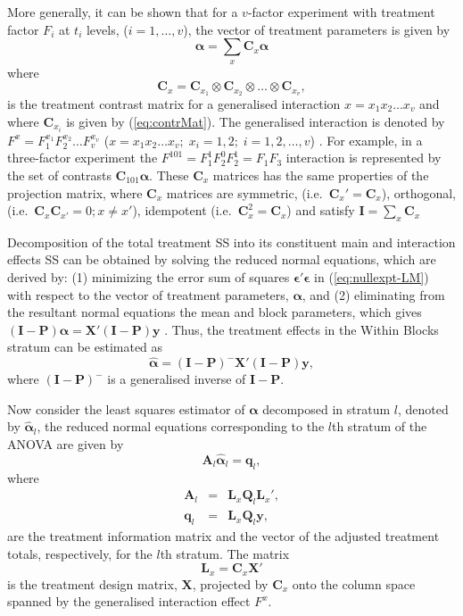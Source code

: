 \documentclass[article]{jss}
\newcommand{\mP}{\mathbf{P}}
\newcommand{\I}{\mathbf{I}}
\newcommand{\X}{\mathbf{X}}
\newcommand{\Q}{\mathbf{Q}}
\newcommand{\A}{\mathbf{A}}
\newcommand{\C}{\mathbf{C}}
\newcommand{\mL}{\mathbf{L}}
\begin{document}
More generally, it can be shown that for a $v$-factor experiment with treatment factor $F_i$ at $t_i$ levels, ($i = 1, \dots, v$), the vector of treatment parameters is given by 
\begin{equation}
\bm{\alpha} = \sum_x{\C_x\bm{\alpha}}
\end{equation}
where 
\[
\C_x =  \C_{x_1} \otimes  \C_{x_2} \otimes \dots \otimes  \C_{x_{v}},
\]
is the treatment contrast matrix for a generalised interaction $x = x_1 x_2 \dots x_{v}$ and where  
$\C_{x_i}$ is given by (\ref{eq:contrMat}). The generalised interaction is denoted by $F^{x}=  F^{x_1}_1 F^{x_2}_2 \dots F^{x_v}_v$ ($x = x_1 x_2 \dots x_{v}; \; x_i= 1,2; \; i=1,2,\ldots,v$) \citep{John1987}. For example, in a three-factor experiment the $F^{101} =F^{1}_1 F^{0}_2 F^{1}_2 = F_1F_3$ interaction is represented by the set of contrasts $\C_{101}\bm{\alpha}$. These $\C_x$ matrices has the same properties of the projection matrix, where $\C_x$ matrices are symmetric, (i.e.\ $\C_x' = \C_x$), orthogonal, (i.e.\ $\C_x\C_{x'} = 0; x \neq x'$), idempotent (i.e.\ $\C_x^2 = \C_x$) and satisfy $\I = \sum_x{\C_x}$ \cite{John1987}

Decomposition of the total treatment SS into its constituent main and interaction effects SS can be obtained by solving the reduced normal equations, which are derived by: (1) minimizing the error sum of squares $\bm{\epsilon}'\bm{\epsilon}$ in (\ref{eq:nullexpt-LM}) with respect to the vector of treatment parameters, $\bm{\alpha}$, and (2) eliminating from the resultant normal equations the mean and block parameters, which gives $(\I - \mP) \bm{\alpha} = \X' (\I - \mP)\bm{y}$ \citep{John1987}. Thus, the treatment effects in the Within Blocks stratum can be estimated as  
\[
\hat{\bm{\alpha}} = (\I - \mP)^{-} \X' (\I - \mP)\bm{y}, 
\] 
where $(\I - \mP)^{-}$ is a generalised inverse of $\I - \mP$. 

Now consider the least squares estimator of $\bm{\alpha}$ decomposed in stratum $l$, denoted by  $\hat{\bm{\alpha}}_l$, the reduced normal equations corresponding to the $l$th stratum of the ANOVA are given by
\begin{equation}\label{eq:reduceNorml}
\A_l\hat{\bm{\alpha}}_l = \bm{q}_l,
\end{equation}
where
\begin{eqnarray}
\label{eq:infomat-stratuml} \A_l &=& \mL_{x} \Q_l \mL_{x}',\\
\label{eq:adjtrttotals-stratuml} \bm{q}_l &=& \mL_{x} \Q_l\bm{y},
\end{eqnarray}  
are the treatment information matrix and the vector of the adjusted treatment totals, respectively, for the $l$th stratum. The matrix 
\[
\mL_{x} = \C_x \X'
\]
is the treatment design matrix, $\X$, projected by $\C_{x}$ onto the column space spanned by the generalised interaction effect $F^{x}$.
\end{document}
